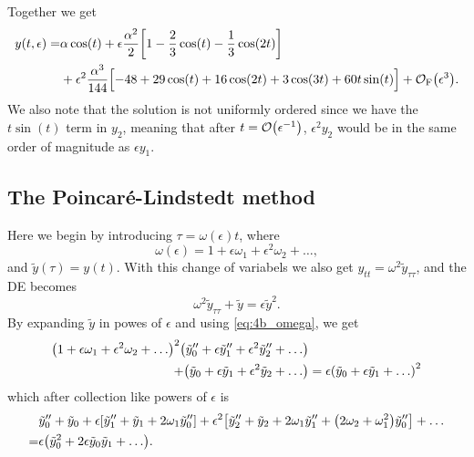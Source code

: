 \documentclass[11pt,letter, swedish, english
]{article}
\begin{document}
Together we get
\begin{equation}\label{eq:4_RPT}
\begin{aligned}
y(t, \epsilon)=&\alpha\cos(t)+\epsilon\frac{\alpha^2}{2}
\qty[1-\frac{2}{3}\cos(t)-\frac{1}{3}\cos(2t)]\\
&+\epsilon^2\frac{\alpha^3}{144}
\qty[-48+29\cos(t)+16\cos(2t)+3\cos(3t)+60t\sin(t)\Big.]
+\mathcal{O}_\text{F}\qty(\epsilon^3).
\end{aligned}
\end{equation}
We also note that the solution is not uniformly ordered since we have
the $t\sin(t)$ term in $y_2$, meaning that after
$t=\order{\epsilon^{-1}}$, $\epsilon^2y_2$ would be in the same order
of magnitude as $\epsilon y_1$.


\subsection{The Poincaré-Lindstedt method}
\newcommand{\ty}{\ensuremath{\tilde{y}}}
Here we begin by introducing $\tau=\omega(\epsilon)t$, where
\begin{equation}\label{eq:4b_omega}
\omega(\epsilon)=1+\epsilon\omega_1+\epsilon^2\omega_2+\ldots,
\end{equation}
and $\ty(\tau)=y(t)$.
With this change of variabels we also get
$y_{tt}=\omega^2\ty_{\tau\tau}$, and the DE becomes
\begin{equation}
\omega^2\ty_{\tau\tau} +\ty = \epsilon\ty^2.
\end{equation}
By expanding $\ty$ in powes of $\epsilon$ and using
\eqref{eq:4b_omega}, we get
\begin{equation}
\begin{aligned}
\qty(1+\epsilon\omega_1+\epsilon^2\omega_2+\ldots)^2
\qty(\ty_0''+\epsilon\ty_1''+\epsilon^2\ty_2''+\ldots)&\\
+
\qty(\ty_0+\epsilon\ty_1+\epsilon^2\ty_2+\ldots)
&=\epsilon\qty(\ty_0+\epsilon\ty_1+\ldots)^2
\end{aligned}
\end{equation}
which after collection like powers of $\epsilon$ is
\begin{equation}
\begin{aligned}
&\ty_0''+\ty_0+\epsilon\qty[\ty_1''+\ty_1+2\omega_1\ty_0'']
+\epsilon^2\qty[\ty_2''+\ty_2+2\omega_1\ty_1''+\qty(2\omega_2+\omega_1^2)\ty_0'']
+\ldots\\
=&\epsilon\qty(\ty_0^2+2\epsilon\ty_0\ty_1+\ldots).
\end{aligned}
\end{equation}
\end{document}
